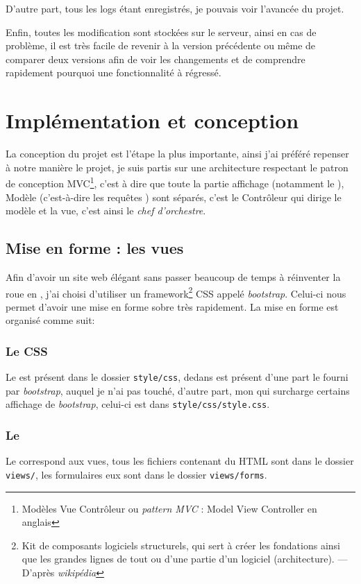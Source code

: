 \documentclass[12pt,a4paper,openany]{book}
\newcommand{\bootstrap}{\textit{bootstrap}}
\begin{document}
	D'autre part, tous les logs étant enregistrés, je pouvais voir l'avancée du projet. 

	Enfin, toutes les modification sont stockées sur le serveur, ainsi en cas de problème, il est très facile de revenir à la version précédente ou même de
	comparer deux versions afin de voir les changements et de comprendre rapidement pourquoi une fonctionnalité à régressé. 

	\chapter{Implémentation et conception}
		La conception du projet est l'étape la plus importante, ainsi j'ai préféré repenser à notre manière le projet, 
		je suis partis sur une architecture respectant le patron de conception MVC\footnote{Modèles Vue Contrôleur ou
		\textit{pattern MVC} : Model View Controller en anglais}, c'est à
		dire que toute la partie affichage (notamment le ), Modèle (c'est-à-dire les requêtes ) sont séparés, 
		c'est le Contrôleur qui dirige le modèle et la vue, c'est ainsi le \textit{chef d'orchestre}.
		\section{Mise en forme : les vues}
			Afin d'avoir un site web élégant sans passer beaucoup de temps à réinventer la roue en , j'ai choisi d'utiliser un
			framework\footnote{Kit de composants logiciels structurels, qui sert à créer les fondations ainsi que les grandes lignes de tout ou d’une partie d'un
			logiciel (architecture). --- D'après \textit{wikipédia}} CSS
			appelé \bootstrap{}. Celui-ci nous permet d'avoir une mise en forme sobre très rapidement.  La mise en forme est organisé comme suit:

			\subsection{Le CSS} Le  est présent dans le dossier \texttt{style/css}, dedans est présent d'une part le
			 fourni par \bootstrap{}, auquel je n'ai pas touché, d'autre part, mon  qui surcharge certains affichage de \bootstrap{}, celui-ci est dans \texttt{style/css/style.css}.
			
				
		\subsection{Le }
		Le  correspond aux vues, tous les fichiers contenant du HTML sont dans le dossier \texttt{views/}, les formulaires 
		eux sont dans le dossier \texttt{views/forms}.
		
\end{document}
